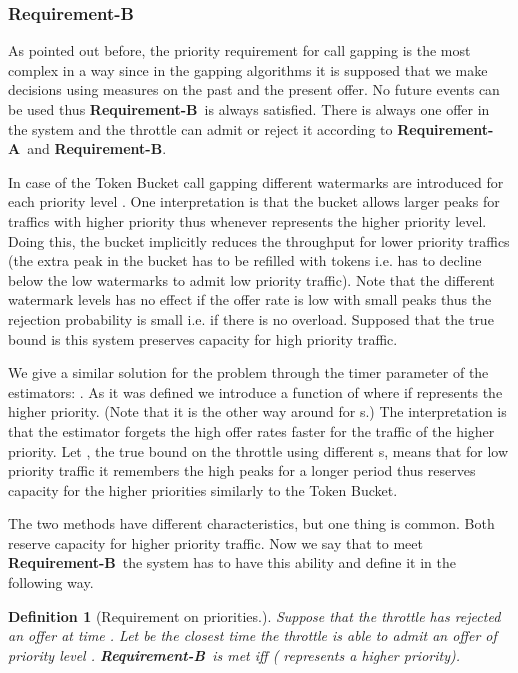 \documentclass[conference]{IEEEtran}
\newtheorem{definition}{Definition}
\newcommand{\reqA}{\textbf{Requirement-A}}
\newcommand{\reqB}{\textbf{Requirement-B}}
\begin{document}
\subsubsection{Requirement-B}
As pointed out before, the priority requirement for call gapping is
the most complex in a way since in the gapping algorithms it is
supposed that we make decisions using measures on the past and the
present offer. No future events can be used thus \reqB\ is always
satisfied. There is always one offer in the system and the throttle
can admit or reject it according to \reqA\ and \reqB.

In case of the Token Bucket call gapping different watermarks 
are introduced for each priority level . One interpretation is
that the bucket allows larger peaks for traffics with higher
priority thus  whenever  represents the higher priority
level. Doing this, the bucket implicitly reduces the throughput for
lower priority traffics (the extra peak in the bucket has to be
refilled with tokens i.e.  has to decline below the low
watermarks to admit low priority traffic). Note that the different
watermark levels has no effect if the offer rate is low with small
peaks thus the rejection probability is small i.e. if there is no
overload. Supposed that the true bound is  this
system preserves capacity for high priority traffic.

We give a similar solution for the problem through the timer
parameter of the estimators: . As it was defined we introduce a
function of  where  if  represents
the higher priority. (Note that it is the other way around for
s.) The interpretation is that the estimator forgets the high
offer rates faster for the traffic of the higher priority. Let
, the true bound on the throttle using different
s, means that for low priority traffic it remembers the high
peaks for a longer period thus reserves capacity for the higher
priorities similarly to the Token Bucket.

The two methods have different characteristics, but one thing is
common. Both reserve capacity for higher priority traffic. Now we
say that to meet \reqB\ the system has to have this ability and
define it in the following way.

\begin{definition}[Requirement on priorities.]
Suppose that the throttle has rejected an offer at time .
Let  be the closest time the throttle is able to admit an
offer of priority level . \reqB\ is met iff  ( represents a
higher priority).
\end{definition}
\end{document}
